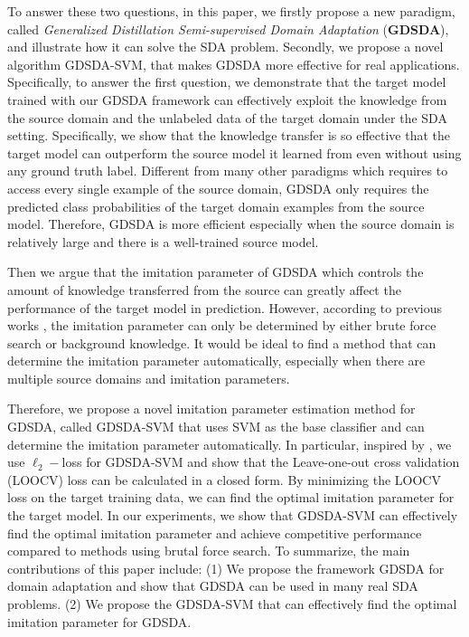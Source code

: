 To answer these two questions, in this paper, we firstly propose a new paradigm, called \textit{Generalized Distillation Semi-supervised Domain Adaptation} (\textbf{GDSDA}), and illustrate how it can solve the SDA problem. Secondly, we propose a novel algorithm GDSDA-SVM, that makes GDSDA more effective for real applications. Specifically, to answer the first question, we demonstrate that the target model trained with our GDSDA framework can effectively exploit the knowledge from the source domain and the unlabeled data of the target domain under the SDA setting. Specifically, we show that the knowledge transfer is so effective that the target model can outperform the source model it learned from even without using any ground truth label. 
Different from many other paradigms which requires to access every single example of the source domain, GDSDA only requires the predicted class probabilities of the target domain examples from the source model. Therefore, GDSDA is more efficient especially when the source domain is relatively large and there is a well-trained source model.

Then we argue that the imitation parameter of GDSDA which controls the amount of knowledge transferred from the source can greatly affect the performance of the target model in prediction.
However, according to previous works \cite{lopez2015unifying,Tzeng_2015_ICCV}, the imitation parameter can only be determined by either brute force search or background knowledge. It would be ideal to find a method that can determine the imitation parameter automatically, especially when there are multiple source domains and imitation parameters.

Therefore, we propose a novel imitation parameter estimation method for GDSDA, called GDSDA-SVM that uses SVM as the base classifier and can determine the imitation parameter automatically. In particular, inspired by \cite{cawley2006leave}, we use $\ell_2-$loss for GDSDA-SVM and show that the Leave-one-out cross validation (LOOCV) loss can be calculated in a closed form. By minimizing the LOOCV loss on the target training data, we can find the optimal imitation parameter for the target model. In our experiments, we show that GDSDA-SVM can effectively find the optimal imitation parameter and achieve competitive performance compared to methods using brutal force search. To summarize, the main contributions of this paper include: (1) We propose the framework GDSDA for domain adaptation and show that GDSDA can be used in many real SDA problems. (2) We propose the GDSDA-SVM that can effectively find the optimal imitation parameter for GDSDA.

